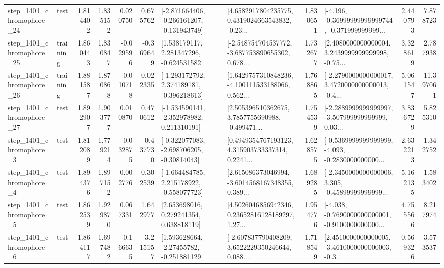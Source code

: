 \begin{tabular}{llrrrrllrlrr}
 step\_1401\_chromophore\_24 &      test &      1.814402 &    1.835152 &      0.020750 &  0.675762 &  [-2.871664406, -0.266161207, -0.131943749] &  [4.6582917804235775, 0.4319024663543832, -0.23... &       1.830651 &  [-4.196, -0.36999999999999744, -0.371999999999... &            2.440793 &          7.878723 \\
 step\_1401\_chromophore\_25 &  training &      1.860443 &    1.830847 &     -0.029596 & -0.369649 &    [1.538179117, 2.281347296, -0.624531582] &  [-2.548754704537772, -3.687753890655302, 0.678... &       1.732677 &  [2.4080000000000004, 3.2439999999999998, -0.75... &            3.328619 &          2.787938 \\
 step\_1401\_chromophore\_26 &  training &      1.881587 &    1.870868 &     -0.010718 &  0.022335 &   [-1.293172792, 2.374189181, -0.396218613] &  [1.6429757310848236, -4.100111533188066, 0.562... &       1.768865 &  [-2.2790000000000017, 3.4720000000000013, -0.4... &            5.061547 &         11.397061 \\
 step\_1401\_chromophore\_27 &      test &      1.892907 &    1.903777 &      0.010870 &  0.470612 &   [-1.534590141, -2.352978982, 0.211310191] &  [2.505396510362675, 3.7857755690988, -0.499471... &       1.754539 &  [-2.2889999999999997, -3.507999999999999, 0.03... &            3.836729 &          5.825310 \\
  step\_1401\_chromophore\_3 &      test &      1.812089 &    1.779214 &     -0.032875 & -0.437730 &   [-0.322077083, -2.698706205, -0.30814043] &  [0.4949354767193123, 4.315903733337314, 0.2241... &       1.628575 &  [-0.5369999999999999, -4.093, -0.2830000000000... &            2.632213 &          1.342752 \\
  step\_1401\_chromophore\_4 &      test &      1.894376 &    1.897152 &      0.002776 &  0.302539 &   [-1.664484785, 2.215178922, -0.558077723] &  [2.615086373046994, -3.6014568167348355, 0.389... &       1.689285 &  [-2.3450000000000006, 3.305, -0.45899999999999... &            5.162135 &          1.583402 \\
  step\_1401\_chromophore\_5 &      test &      1.862539 &    1.929870 &      0.067331 &  1.642977 &     [2.653698016, 0.279241354, 0.638818119] &  [4.5026046856942346, 0.23652816128189297, 1.27... &       1.954776 &  [-4.038, -0.7690000000000001, -0.9100000000000... &            4.755566 &          8.217974 \\
  step\_1401\_chromophore\_6 &      test &      1.864117 &    1.697482 &     -0.166635 & -3.215157 &    [1.593628664, -2.27455782, -0.251881129] &  [-2.607837790408209, 3.6522229350246644, 0.088... &       1.718549 &  [2.4510000000000005, -3.4610000000000003, -0.3... &            0.569326 &          3.573537 \\

\end{tabular}

